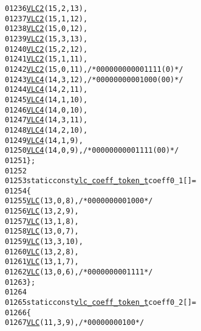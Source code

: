 \begin{footnotesize}
\begin{alltt}
01236         \hyperlink{vlc_8h_ad3cda36b9c6132357c7f7de5e52a6c93}{VLC2}(15, 2, 13),
01237         \hyperlink{vlc_8h_ad3cda36b9c6132357c7f7de5e52a6c93}{VLC2}(15, 1, 12),
01238         \hyperlink{vlc_8h_ad3cda36b9c6132357c7f7de5e52a6c93}{VLC2}(15, 0, 12),
01239         \hyperlink{vlc_8h_ad3cda36b9c6132357c7f7de5e52a6c93}{VLC2}(15, 3, 13),
01240         \hyperlink{vlc_8h_ad3cda36b9c6132357c7f7de5e52a6c93}{VLC2}(15, 2, 12),
01241         \hyperlink{vlc_8h_ad3cda36b9c6132357c7f7de5e52a6c93}{VLC2}(15, 1, 11),
01242         \hyperlink{vlc_8h_ad3cda36b9c6132357c7f7de5e52a6c93}{VLC2}(15, 0, 11),  \textcolor{comment}{/* 0000 0000 0001 111(0) */}
01243         \hyperlink{vlc_8h_a02cdc921d8f03450b12879e8afb222cb}{VLC4}(14, 3, 12),  \textcolor{comment}{/* 0000 0000 0010 00(00) */}
01244         \hyperlink{vlc_8h_a02cdc921d8f03450b12879e8afb222cb}{VLC4}(14, 2, 11),
01245         \hyperlink{vlc_8h_a02cdc921d8f03450b12879e8afb222cb}{VLC4}(14, 1, 10),
01246         \hyperlink{vlc_8h_a02cdc921d8f03450b12879e8afb222cb}{VLC4}(14, 0, 10),
01247         \hyperlink{vlc_8h_a02cdc921d8f03450b12879e8afb222cb}{VLC4}(14, 3, 11),
01248         \hyperlink{vlc_8h_a02cdc921d8f03450b12879e8afb222cb}{VLC4}(14, 2, 10),
01249         \hyperlink{vlc_8h_a02cdc921d8f03450b12879e8afb222cb}{VLC4}(14, 1, 9),
01250         \hyperlink{vlc_8h_a02cdc921d8f03450b12879e8afb222cb}{VLC4}(14, 0, 9),  \textcolor{comment}{/* 0000 0000 0011 11(00) */}
01251 \};
01252 
01253 \textcolor{keyword}{static} \textcolor{keyword}{const} \hyperlink{structvlc__coeff__token__t}{vlc_coeff_token_t} coeff0\_1[] = 
01254 \{
01255         \hyperlink{vlc_8h_a7f3572774a720fd9b4bc3b1a0b65082f}{VLC}(13, 0, 8),   \textcolor{comment}{/* 0000 0000 0100 0 */}
01256         \hyperlink{vlc_8h_a7f3572774a720fd9b4bc3b1a0b65082f}{VLC}(13, 2, 9),
01257         \hyperlink{vlc_8h_a7f3572774a720fd9b4bc3b1a0b65082f}{VLC}(13, 1, 8),
01258         \hyperlink{vlc_8h_a7f3572774a720fd9b4bc3b1a0b65082f}{VLC}(13, 0, 7),
01259         \hyperlink{vlc_8h_a7f3572774a720fd9b4bc3b1a0b65082f}{VLC}(13, 3, 10),
01260         \hyperlink{vlc_8h_a7f3572774a720fd9b4bc3b1a0b65082f}{VLC}(13, 2, 8),
01261         \hyperlink{vlc_8h_a7f3572774a720fd9b4bc3b1a0b65082f}{VLC}(13, 1, 7),
01262         \hyperlink{vlc_8h_a7f3572774a720fd9b4bc3b1a0b65082f}{VLC}(13, 0, 6),  \textcolor{comment}{/* 0000 0000 0111 1 */}
01263 \};
01264 
01265 \textcolor{keyword}{static} \textcolor{keyword}{const} \hyperlink{structvlc__coeff__token__t}{vlc_coeff_token_t} coeff0\_2[] = 
01266 \{
01267         \hyperlink{vlc_8h_a7f3572774a720fd9b4bc3b1a0b65082f}{VLC}(11, 3, 9),   \textcolor{comment}{/* 0000 0000 100 */}

\end{alltt}
\end{footnotesize}
